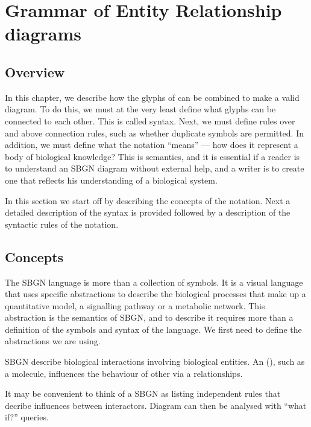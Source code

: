 \chapter{Grammar of Entity Relationship diagrams}
\label{chp:grammar}

\section{Overview}

In this chapter, we describe how the glyphs of \SBGNERLone can be combined
to make a valid \ER{} diagram. To do this, we must at the very least
define what glyphs can be connected to each other. This is called
syntax. Next, we must define rules over and above connection rules,
such as whether duplicate symbols are permitted. In addition, we must define what the notation ``means'' --- how does it represent a body of biological knowledge? This is semantics, and it is essential if a reader is to understand an SBGN diagram without external help, and a writer is to create one that reflects his understanding of a biological system.

In this section we start off by describing the concepts of the
\ER{} notation. Next a detailed description of the syntax is provided
followed by a description of the syntactic rules of the notation.

\section{Concepts}

The SBGN \ER{} language is more than a collection of symbols. It is a
visual language that uses specific abstractions to describe the
biological processes that make up a quantitative model, a signalling pathway or a metabolic network. This abstraction is the semantics of SBGN, and to describe it requires more than a definition
of the symbols and syntax of the language. We first need to define the
abstractions we are using.

SBGN \ERs{} describe biological interactions involving biological entities. An  (), such as a molecule, influences the behaviour of other  via a relationships. 

It may be convenient to think of a SBGN \ERs{} as listing independent rules that decribe influences between interactors. Diagram can then be analysed with ``what if?'' queries. 




